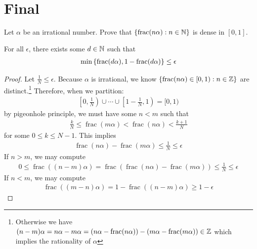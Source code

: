 \documentclass{report}
\begin{document}
\section{Final}
\begin{question}{}{}
  Let $\alpha $ be an irrational number. Prove that $\left\{ \operatorname{frac}(n\alpha ): n\in\mathbb{N}  \right\}$ is dense in $[0,1]$. 
\end{question}
\begin{lemma}
For all $\epsilon $, there exists some  $d \in\mathbb{N}$ such that 
\begin{align*}
  \min  \left\{ \operatorname{frac}(d\alpha ), 1- \operatorname{frac}(d\alpha ) \right\}\leq \epsilon  
\end{align*}
\end{lemma}
\begin{proof}
Let $\frac{1}{N}\leq \epsilon $. Because $\alpha $ is irrational, we know $\left\{ \operatorname{frac}(n\alpha )\in [0,1): n\in\mathbb{Z} \right\}$ are distinct.\footnote{Otherwise we have $(n-m) \alpha  =  n \alpha  - m\alpha = \left(n\alpha - \operatorname{frac}(n\alpha ) \right) - \left(m \alpha  - \operatorname{frac}(m\alpha ) \right)\in\mathbb{Z}$
which implies the rationality of $\alpha$} Therefore, when we partition: 
\begin{align*}
\left[0,\frac{1}{N}\right) \cup  \cdots \cup  \left[1- \frac{1}{N}, 1\right)= [0,1)
\end{align*}
by pigeonhole principle, we must have some $n<m$ such that   
\begin{align*}
\frac{k}{N}\leq \operatorname{frac}(m\alpha )  < \operatorname{frac}(n\alpha ) < \frac{k+1}{N}
\end{align*}
for some $0\leq k \leq N-1$. This implies 
\begin{align*}
\operatorname{frac}(n \alpha )-\operatorname{frac}(m\alpha ) \leq \frac{1}{N} \leq \epsilon 
\end{align*}
If $n> m$, we may compute 
\begin{align*}
0 \leq \operatorname{frac}((n-m)\alpha )= \operatorname{frac}(\operatorname{frac}(n\alpha )-\operatorname{frac}(m\alpha )) \leq \frac{1}{N} \leq  \epsilon 
\end{align*}
If $n<m$, we may compute 
 \begin{align*}
\operatorname{frac}((m-n)\alpha )= 1-\operatorname{frac}((n-m)\alpha ) \geq 1-\epsilon  
\end{align*}
\end{proof}
\end{document}
